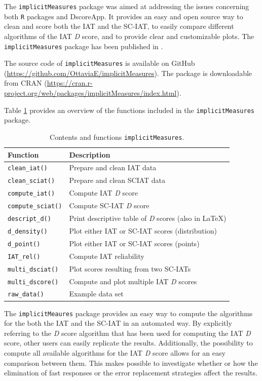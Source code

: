 \documentclass[12pt]{book}
\begin{document}
The \verb*|implicitMeasures| package \cite{implicit, implicitMeasures} was aimed at addressing the issues concerning both \verb*|R| packages and DscoreApp. It provides an easy and open source way to clean and score both the IAT and the SC-IAT, to easily compare different algorithms of the  IAT \emph{D} score, and to provide clear and customizable plots. The \verb*|implicitMeasures| package has been published in .


The source code of \verb*|implicitMeasures| is available on GitHub (\url{https://github.com/OttaviaE/implicitMeasures}). The package is downloadable from CRAN  (\url{https://cran.r-project.org/web/packages/implicitMeasures/index.html}).

Table \ref{tab:implicitmeasures} provides an overview of the functions included in the \verb*|implicitMeasures| package.
\begin{table}[h!]
	\centering \onehalfspacing
	\caption{\label{tab:implicitmeasures} Contents and functions \texttt{implicitMeasures}.}
	\begin{tabular}{p{5cm} p{9cm}}
		\hline
		Function & Description \\
		\hline
		
		\verb*|clean_iat()|& Prepare and clean IAT data\\
		\verb*|clean_sciat()|& Prepare and clean SCIAT data\\
		\verb*|compute_iat()|& Compute IAT \emph{D} score \\
		\verb*|compute_sciat()|& Compute SC-IAT \emph{D} score \\
		\verb*|descript_d()|& Print descriptive table of \emph{D} scores (also in \LaTeX) \\
		\verb*|d_density()|& Plot either IAT or SC-IAT scores (distribution) \\
		\verb*|d_point()|& Plot either IAT or SC-IAT scores (points) \\
		\verb*|IAT_rel()|& Compute IAT reliability \\
		\verb*|multi_dsciat()|& Plot scores resulting from two SC-IATs\\
		\verb*|multi_dscore()|& Compute and plot multiple IAT \emph{D} scores\\
		\verb*|raw_data()|& Example data set \\
		\bottomrule
	\end{tabular}
\end{table}
The \verb*|implicitMeaures| package provides an easy way to compute the algorithms for the both the IAT and the SC-IAT in an automated way. By explicitly referring to the \emph{D} score algorithm that has been used for computing the IAT \emph{D} score, other users can easily replicate the results. 
Additionally, the possibility to compute all available algorithms for the IAT \emph{D} score allows for an easy comparison between them. This makes possible to investigate whether or how the elimination of fast responses or the error replacement strategies affect the results. 
\end{document}
